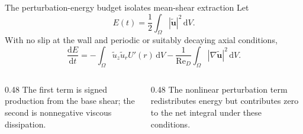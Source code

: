 \documentclass[aspectratio=169,11pt]{beamer}
\newcommand{\Rey}{\mathrm{Re}}
\newcommand{\uu}{\bm{u}}
\begin{document}
\begin{frame}{The perturbation-energy budget isolates mean-shear extraction}
Let
\[
  E(t)=\frac12\int_\Omega|\widetilde{\uu}|^2\,\mathrm dV.
\]
With no slip at the wall and periodic or suitably decaying axial conditions,
\[
  \frac{\mathrm dE}{\mathrm dt}
  =-\int_\Omega \widetilde u_z\widetilde u_rU'(r)\,\mathrm dV
   -\frac1{\Rey_D}\int_\Omega|\nabla\widetilde{\uu}|^2\,\mathrm dV.
\]

\begin{columns}[T,onlytextwidth]
\begin{column}{0.48\textwidth}
The first term is signed production from the base shear; the second is nonnegative viscous dissipation.
\end{column}
\begin{column}{0.48\textwidth}
The nonlinear perturbation term redistributes energy but contributes zero to the net integral under these conditions.
\end{column}
\end{columns}

\end{frame}
\end{document}
